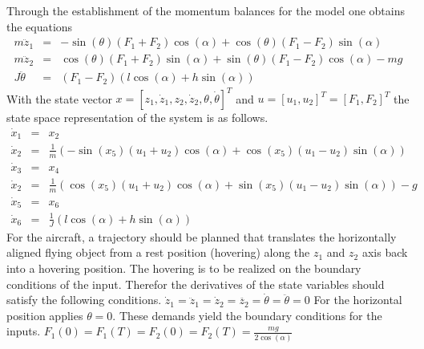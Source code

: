 \documentclass[letterpaper,10pt,english]{sphinxmanual}
\begin{document}

Through the establishment of the momentum balances for the model one
obtains the equations
\begin{eqnarray*}
   m \ddot{z}_1 & = & - \sin(\theta)(F_1 + F_2)\cos(\alpha) + \cos(\theta)(F_1 - F_2)\sin(\alpha) \\
   m \ddot{z}_2 & = & \cos(\theta)(F_1 + F_2)\sin(\alpha) + \sin(\theta)(F_1 - F_2)\cos(\alpha) - mg \\
   J \ddot{\theta} & = & (F_1 - F_2)(l \cos(\alpha) + h \sin(\alpha))
\end{eqnarray*}
With the state vector \(x = [z_1, \dot{z}_1, z_2, \dot{z}_2, \theta, \dot{\theta}]^T\)
and \(u = [u_1, u_2]^T = [F_1, F_2]^T\) the state space
representation of the system is as follows.
\begin{eqnarray*}
   \dot{x}_1 & = & x_2 \\
   \dot{x}_2 & = & \frac{1}{m}(-\sin(x_5)(u_1 + u_2)\cos(\alpha) + \cos(x_5)(u_1 - u_2)\sin(\alpha)) \\
   \dot{x}_3 & = & x_4 \\
   \dot{x}_2 & = & \frac{1}{m}(\cos(x_5)(u_1 + u_2)\cos(\alpha) + \sin(x_5)(u_1 - u_2)\sin(\alpha)) - g  \\
   \dot{x}_5 & = & x_6 \\
   \dot{x}_6 & = & \frac{1}{J}(l \cos(\alpha) + h \sin(\alpha))
\end{eqnarray*}
For the aircraft, a trajectory should be planned that translates the
horizontally aligned flying object from a rest position (hovering) along
the \(z_1\) and \(z_2\) axis back into a hovering position.
The hovering is to be realized on the boundary conditions of the input.
Therefor the derivatives of the state variables should satisfy the
following conditions.
$ \dot{z}_1 = \ddot{z}_1 = \dot{z}_2 = \ddot{z_2} = \dot{\theta} = \ddot{\theta} = 0 $
For the horizontal position applies \(\theta = 0\). These demands
yield the boundary conditions for the inputs.
$ F_1(0) = F_1(T) = F_2(0) = F_2(T) = \frac{mg}{2 \cos(\alpha)} $
\end{document}
